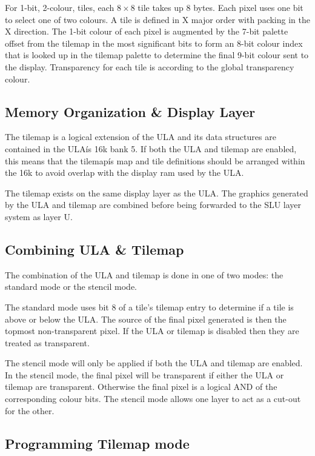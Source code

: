 For 1-bit, 2-colour, tiles, each $8\times8$ tile takes up 8
bytes. Each pixel uses one bit to select one of two colours. A tile is
defined in X major order with packing in the X direction. The 1-bit
colour of each pixel is augmented by the 7-bit palette offset from the
tilemap in the most significant bits to form an 8-bit colour index
that is looked up in the tilemap palette to determine the final 9-bit
colour sent to the display. Transparency for each tile is according to
the global transparency colour.

\subsection{Memory Organization \& Display Layer}
The tilemap is a logical extension of the ULA and its data structures
are contained in the ULAís 16k bank 5. If both the ULA and tilemap are
enabled, this means that the tilemapís map and tile definitions should
be arranged within the 16k to avoid overlap with the display ram used
by the ULA.

The tilemap exists on the same display layer as the ULA. The graphics
generated by the ULA and tilemap are combined before being forwarded
to the SLU layer system as layer U.

\subsection{Combining ULA \& Tilemap}
The combination of the ULA and tilemap is done in one of two modes:
the standard mode or the stencil mode.

The standard mode uses bit 8 of a tile's tilemap entry to determine if
a tile is above or below the ULA. The source of the final pixel
generated is then the topmost non-transparent pixel. If the ULA or
tilemap is disabled then they are treated as transparent.

The stencil mode will only be applied if both the ULA and tilemap are
enabled. In the stencil mode, the final pixel will be transparent if
either the ULA or tilemap are transparent. Otherwise the final pixel
is a logical AND of the corresponding colour bits. The stencil mode
allows one layer to act as a cut-out for the other.

\subsection{Programming Tilemap mode}



